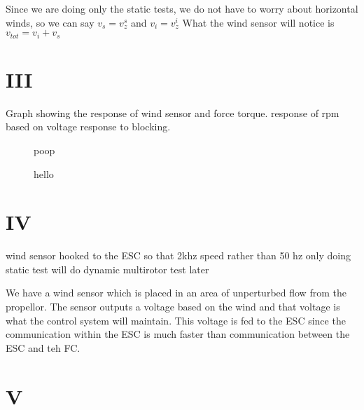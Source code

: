 \documentclass[twocolumn]{article}
\begin{document}
	Since we are doing only the static tests, we do not have to worry about horizontal winds, so we can say $v_s = v^s_{z}$ and $v_i = v^i_{z}$
	What the wind sensor will notice is $v_{tot} = v_{i} + v_{s}$\\
	\section{III} 
	
	Graph showing the response of wind sensor and force torque.
	response of rpm based on voltage
	response to blocking. 
	\begin{figure}[h]
	
	\caption{poop}
	\end{figure}
	\begin{figure}[h]
		
		\caption{hello}
	\end{figure}
	\section{IV}
	wind sensor hooked to the ESC so that 2khz speed rather than 50 hz
	only doing static test
	will do dynamic multirotor test later
	
	We have a wind sensor which is placed in an area of unperturbed flow from the propellor. The sensor outputs a voltage based on the wind and that voltage is what the control system will maintain. This voltage is fed to the ESC since the communication within the ESC is much faster than communication between the ESC and teh FC.  
	
	
	\section{V}
	
\end{document}
